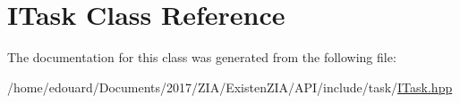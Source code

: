 \hypertarget{classITask}{}\section{I\+Task Class Reference}
\label{classITask}


The documentation for this class was generated from the following file\+:\begin{DoxyCompactItemize}
\item 
/home/edouard/\+Documents/2017/\+Z\+I\+A/\+Existen\+Z\+I\+A/\+A\+P\+I/include/task/\mbox{\hyperlink{ITask_8hpp}{I\+Task.\+hpp}}\end{DoxyCompactItemize}
